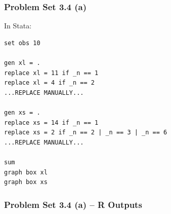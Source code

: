 \documentclass[xcolor=table]{beamer}
\begin{document}
\begin{frame}[fragile]
\frametitle{Problem Set 3.4 (a)}
In Stata:
\begin{lstlisting}
set obs 10

gen xl = .
replace xl = 11 if _n == 1
replace xl = 4 if _n == 2
...REPLACE MANUALLY...

gen xs = .
replace xs = 14 if _n == 1
replace xs = 2 if _n == 2 | _n == 3 | _n == 6
...REPLACE MANUALLY...

sum
graph box xl
graph box xs
\end{lstlisting}
\end{frame}

\begin{frame}
\frametitle{Problem Set 3.4 (a) -- R Outputs}
\begin{figure}
  \centering
  \qquad
\label{fig:fig}
\end{figure}
\end{frame}

\end{document}
